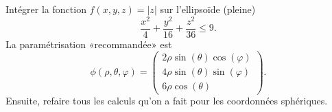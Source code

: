 
\begin{exercice}\label{exoOutilsMath-0113}

    Intégrer la fonction $f(x,y,z)=| z |$ sur l'ellipsoïde (pleine)
    \begin{equation}
        \frac{ x^2 }{ 4 }+\frac{ y^2 }{ 16 }+\frac{ z^2 }{ 36 }\leq 9.
    \end{equation}
    La paramétrisation «recommandée» est
    \begin{equation}
        \phi(\rho,\theta,\varphi)=\begin{pmatrix}
            2\rho\sin(\theta)\cos(\varphi)    \\ 
            4\rho\sin(\theta)\sin(\varphi)    \\ 
            6\rho\cos(\theta)    
        \end{pmatrix}.
    \end{equation}
    Ensuite, refaire tous les calculs qu'on a fait pour les coordonnées sphériques.

\end{exercice}
